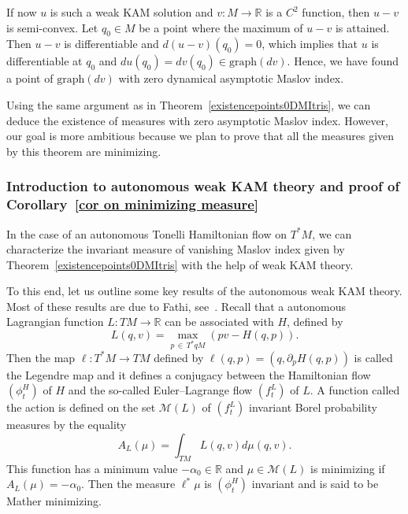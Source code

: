 \documentclass[AHL, Unicode, longabstracts, published]{cedram}
\newcommand*\M{\mathcal{M}}
\newcommand{\Graph}{\mathrm{graph}}
\newcommand*\R{\mathbb{R}}
\begin{document}
If now $u$ is such a weak KAM solution and $v:M\to\R$ is a $C^2$ function, then $u-v$ is semi-convex. Let $q_0\in M$ be a point where the maximum of $u-v$ is attained. Then $u-v$ is differentiable and $d(u-v)(q_0)=0$, which implies that $u$ is differentiable at $q_0$ and $du(q_0)=dv(q_0)\in \Graph(dv)$. Hence, we have found a point of $\Graph(dv)$ with zero dynamical asymptotic Maslov index.

Using the same argument as in Theorem~\ref{existencepoints0DMItris}, we can deduce the existence of measures with zero asymptotic Maslov index. However, our goal is more ambitious because we plan to prove that all the measures given by this theorem are minimizing.



\subsubsection{Introduction to autonomous weak KAM theory and proof of Corollary~\ref{cor on minimizing measure}}



In the case of an autonomous Tonelli Hamiltonian flow on $T^*M$, we can characterize the invariant measure of vanishing Maslov index given by Theorem~\ref{existencepoints0DMItris} with the help of weak KAM theory. 

To this end, let us outline some key results of the autonomous weak KAM theory. Most of these results are due to Fathi, see~\cite{Fathi2008}.\newline
Recall that a autonomous Lagrangian function $L:TM\to\R$ can be associated with $H$, defined by
\[
L(q, v)=\max_{p\,\in\,T^*qM}(pv-H(q,p)).
\]
Then the map ${\ell}:T^*M\to TM$ defined by ${\ell}(q, p)=(q, \partial_pH(q,p))$ is called the Legendre map and it defines a conjugacy between the Hamiltonian flow $(\phi^H_t)$ of $H$ and the so-called Euler--Lagrange flow $(f^L_t)$ of $L$.\newline
A function called the action is defined on the set $\M(L)$ of $(f^L_t)$ invariant Borel probability measures by the equality
\[
A_L(\mu)=\int_{TM}L(q, v)d\mu(q, v).
\]
This function has a minimum value $-\alpha_0\in \R$ and $\mu\in \M(L)$ is minimizing if $A_L(\mu)=-\alpha_0$. Then the measure ${\ell}^*\mu$ is $(\phi^H_t)$ invariant and is said to be Mather minimizing.
\end{document}
